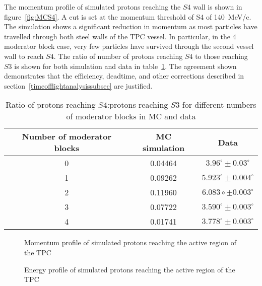 The momentum profile of simulated protons reaching the $\mathit{S4}$ wall is shown in figure~\ref{fig:MCS4}. A cut is set at the momentum threshold of S4 of 140~MeV/c. The simulation shows a significant reduction in momentum as most particles have travelled through both steel walls of the TPC vessel. In particular, in the 4 moderator block case, very few particles have survived through the second vessel wall to reach $\mathit{S4}$. The ratio of number of protons reaching $\mathit{S4}$ to those reaching $\mathit{S3}$ is shown for both simulation and data in table~\ref{tab:ratios}. The agreement shown demonstrates that the efficiency, deadtime, and other corrections described in section~\ref{timeofflightanalysissubsec} are justified.
\begin{table}
  \centering
  \begin{tabular}{|c|c|c|}
    \hline
    Number of moderator blocks & MC simulation & Data \\
    \hline
    0  & 0.04464 & $3.96^{\circ} \pm 0.03^{\circ}$ \\
    1 &  0.09262 & $5.923^{\circ} \pm 0.004^{\circ}$  \\
    2 & 0.11960 & $6.083{\circ} \pm 0.003^{\circ}$ \\
    3 & 0.07722 & $3.590^{\circ} \pm 0.003^{\circ}$\\
    4 & 0.01741 & $3.778^{\circ} \pm 0.003^{\circ}$ \\
    \hline
  \end{tabular}
  \caption{Ratio of protons reaching $\mathit{S4}$:protons reaching $\mathit{S3}$ for different numbers of moderator blocks in MC and data}
  \label{tab:ratios}
\end{table}




\begin{figure}[!ht]
  \begin{minipage}[t]{0.48\textwidth}
    \begin{adjustbox}{max totalsize={\textwidth}{.35\textheight}, center}
      
    \end{adjustbox}
    \caption{Momentum profile of simulated protons reaching the active region of the TPC}
    \label{fig:MCTPC}
  \end{minipage}
  \hspace{0.3cm}
  \begin{minipage}[t]{0.48\textwidth}
    \begin{adjustbox}{max totalsize={\textwidth}{.35\textheight}, center}
      
    \end{adjustbox}
    \caption{Energy profile of simulated protons reaching the active region of the TPC}
    \label{fig:MCKE}
  \end{minipage}	
\end{figure}


